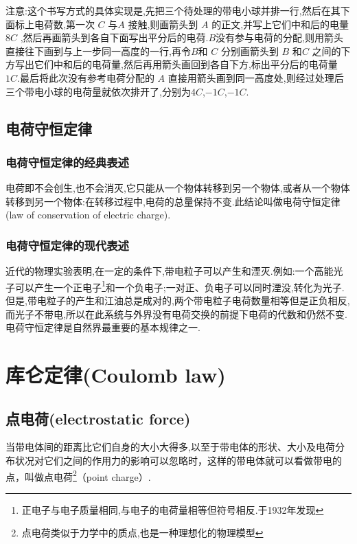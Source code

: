 注意:这个书写方式的具体实现是,先把三个待处理的带电小球并排一行,然后在其下面标上电荷数,第一次 $C$ 与$A$ 接触,则画箭头到 $A$ 的正文,并写上它们中和后的电量 $8C$ ,然后再画箭头到各自下面写出平分后的电荷.$B$没有参与电荷的分配,则用箭头直接往下画到与上一步同一高度的一行,再令$B$和 $C$ 分别画箭头到 $B$
和$C$ 之间的下方写出它们中和后的电荷量,然后再用箭头画回到各自下方,标出平分后的电荷量 $1C$.最后将此次没有参考电荷分配的 $A$ 直接用箭头画到同一高度处,则经过处理后三个带电小球的电荷量就依次排开了,分别为$4C$,$-1C$,$-1C$.


\subsection{电荷守恒定律}

\subsubsection{电荷守恒定律的经典表述}

电荷即不会创生,也不会消灭,它只能从一个物体转移到另一个物体,或者从一个物体转移到另一个物体:在转移过程中,电荷的总量保持不变.此结论叫做电荷守恒定律(law of conservation of electric charge).

\subsubsection{电荷守恒定律的现代表述}


近代的物理实验表明,在一定的条件下,带电粒子可以产生和湮灭.例如:一个高能光子可以产生一个正电子\footnote{正电子与电子质量相同,与电子的电荷量相等但符号相反.于1932年发现}和一个负电子;一对正、负电子可以同时湮没,转化为光子.但是,带电粒子的产生和江油总是成对的,两个带电粒子电荷数量相等但是正负相反,而光子不带电,所以在此系统与外界没有电荷交换的前提下电荷的代数和仍然不变.电荷守恒定律是自然界最重要的基本规律之一.

\section{库仑定律(Coulomb law)}
\subsection{点电荷(electrostatic force)}

当带电体间的距离比它们自身的大小大得多,以至于带电体的形状、大小及电荷分布状况对它们之间的作用力的影响可以忽略时，这样的带电体就可以看做带电的点，叫做点电荷\footnote{点电荷类似于力学中的质点,也是一种理想化的物理模型}（point charge）.

